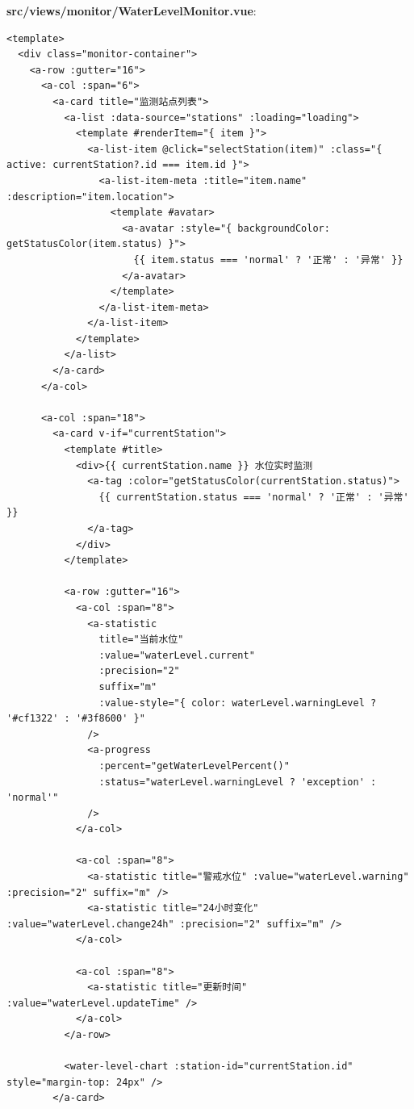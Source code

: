 \textbf{src/views/monitor/WaterLevelMonitor.vue}:

\begin{lstlisting}
<template>
  <div class="monitor-container">
    <a-row :gutter="16">
      <a-col :span="6">
        <a-card title="监测站点列表">
          <a-list :data-source="stations" :loading="loading">
            <template #renderItem="{ item }">
              <a-list-item @click="selectStation(item)" :class="{ active: currentStation?.id === item.id }">
                <a-list-item-meta :title="item.name" :description="item.location">
                  <template #avatar>
                    <a-avatar :style="{ backgroundColor: getStatusColor(item.status) }">
                      {{ item.status === 'normal' ? '正常' : '异常' }}
                    </a-avatar>
                  </template>
                </a-list-item-meta>
              </a-list-item>
            </template>
          </a-list>
        </a-card>
      </a-col>
      
      <a-col :span="18">
        <a-card v-if="currentStation">
          <template #title>
            <div>{{ currentStation.name }} 水位实时监测
              <a-tag :color="getStatusColor(currentStation.status)">
                {{ currentStation.status === 'normal' ? '正常' : '异常' }}
              </a-tag>
            </div>
          </template>
          
          <a-row :gutter="16">
            <a-col :span="8">
              <a-statistic 
                title="当前水位" 
                :value="waterLevel.current" 
                :precision="2"
                suffix="m" 
                :value-style="{ color: waterLevel.warningLevel ? '#cf1322' : '#3f8600' }"
              />
              <a-progress 
                :percent="getWaterLevelPercent()" 
                :status="waterLevel.warningLevel ? 'exception' : 'normal'"
              />
            </a-col>
            
            <a-col :span="8">
              <a-statistic title="警戒水位" :value="waterLevel.warning" :precision="2" suffix="m" />
              <a-statistic title="24小时变化" :value="waterLevel.change24h" :precision="2" suffix="m" />
            </a-col>
            
            <a-col :span="8">
              <a-statistic title="更新时间" :value="waterLevel.updateTime" />
            </a-col>
          </a-row>
          
          <water-level-chart :station-id="currentStation.id" style="margin-top: 24px" />
        </a-card>
        

\end{lstlisting}
